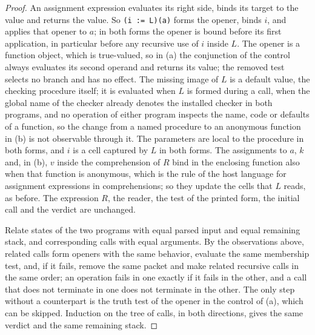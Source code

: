 \begin{proof}
An assignment expression evaluates its right side, binds its target to the
value and returns the value. So \texttt{(i := L)(a)} forms the opener, binds
$i$, and applies that opener to $a$; in both forms the opener is bound before
its first application, in particular before any recursive use of $i$ inside
$L$. The opener is a function object, which is true-valued, so in (a) the
conjunction of the control always evaluates its second operand and returns
its value; the removed test selects no branch and has no effect. The missing
image of $L$ is a default value, the checking procedure itself; it is
evaluated when $L$ is formed during a call, when the global name of the
checker already denotes the installed checker in both programs, and no
operation of either program inspects the name, code or defaults of a
function, so the change from a named procedure to an anonymous function in
(b) is not observable through it. The parameters are local to the procedure
in both forms, and $i$ is a cell captured by $L$ in both forms. The
assignments to $a$, $k$ and, in (b), $v$ inside the comprehension of $R$ bind
in the enclosing function also when that function is anonymous, which is the
rule of the host language for assignment expressions in comprehensions; so
they update the cells that $L$ reads, as before. The expression $R$, the
reader, the test of the printed form, the initial call and the verdict are
unchanged.

Relate states of the two programs with equal parsed input and equal
remaining stack, and corresponding calls with equal arguments. By the
observations above, related calls form openers with the same behavior,
evaluate the same membership test, and, if it fails, remove the same packet
and make related recursive calls in the same order; an operation fails in one
exactly if it fails in the other, and a call that does not terminate in one
does not terminate in the other. The only step without a counterpart is the
truth test of the opener in the control of (a), which can be skipped.
Induction on the tree of calls, in both directions, gives the same verdict
and the same remaining stack.
\end{proof}

